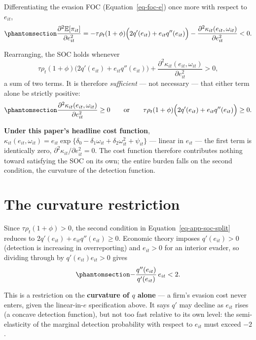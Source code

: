 \documentclass[
  12pt,
  letterpaper,
  oneside,
  openany]{report}
\begin{document}
Differentiating the evasion FOC (Equation~\ref{eq-foc-e}) once more with
respect to \(e_{it}\),
\begin{equation}\protect\phantomsection\label{eq-app-soc-full}{
\frac{\partial^2\mathbb{E}[\pi_{it}]}{\partial e_{it}^2}=-\tau\rho_t(1+\phi)\Big(2q'(e_{it})+e_{it}q''(e_{it})\Big)-\frac{\partial^2\kappa_{it}(e_{it},\omega_{it})}{\partial e_{it}^2}<0.
}\end{equation}

Rearranging, the SOC holds whenever \[
\tau\rho_t(1+\phi)\Big(2q'(e_{it})+e_{it}q''(e_{it})\Big)+\frac{\partial^2\kappa_{it}(e_{it},\omega_{it})}{\partial e_{it}^2}>0,
\] a sum of two terms. It is therefore \emph{sufficient} --- not
necessary --- that either term alone be strictly positive:
\begin{equation}\protect\phantomsection\label{eq-app-soc-split}{
\frac{\partial^2\kappa_{it}(e_{it},\omega_{it})}{\partial e_{it}^2}\ge0
\qquad\text{or}\qquad
\tau\rho_t(1+\phi)\Big(2q'(e_{it})+e_{it}q''(e_{it})\Big)\ge0.
}\end{equation}

\textbf{Under this paper's headline cost function},
\(\kappa_{it}(e_{it},\omega_{it})=e_{it}\exp\{\delta_0-\delta_1\omega_{it}+\delta_2\omega_{it}^2+\psi_{it}\}\)
--- linear in \(e_{it}\) --- the first term is identically zero,
\(\partial^2\kappa_{it}/\partial e_{it}^2=0\). The cost function
therefore contributes nothing toward satisfying the SOC on its own; the
entire burden falls on the second condition, the curvature of the
detection function.

\section{The curvature restriction}\label{the-curvature-restriction}

Since \(\tau\rho_t(1+\phi)>0\), the second condition in
Equation~\ref{eq-app-soc-split} reduces to
\(2q'(e_{it})+e_{it}q''(e_{it})\ge0\). Economic theory imposes
\(q'(e_{it})>0\) (detection is increasing in overreporting) and
\(e_{it}>0\) for an interior evader, so dividing through by
\(q'(e_{it})e_{it}>0\) gives
\begin{equation}\protect\phantomsection\label{eq-app-soc-final}{
-\frac{q''(e_{it})}{q'(e_{it})}\,e_{it}<2.
}\end{equation}

This is a restriction on the \textbf{curvature of \(q\) alone} --- a
firm's evasion cost never enters, given the linear-in-\(e\)
specification above. It says \(q'\) may decline as \(e_{it}\) rises (a
concave detection function), but not too fast relative to its own level:
the semi-elasticity of the marginal detection probability with respect
to \(e_{it}\) must exceed \(-2\).
\end{document}
